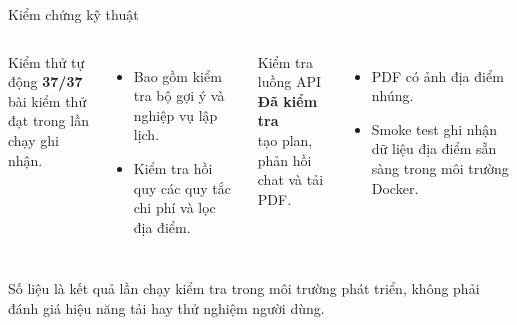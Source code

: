 \documentclass[aspectratio=169,11pt]{beamer}
\begin{document}
\begin{frame}{Kiểm chứng kỹ thuật}
  \begin{columns}[T,onlytextwidth]
      \begin{block}{Kiểm thử tự động}
        \centering
        {\Huge\color{travelgreen}\bfseries 37/37}\\
        \small bài kiểm thử đạt trong lần chạy ghi nhận.
      \end{block}
      \begin{itemize}
        \item Bao gồm kiểm tra bộ gợi ý và nghiệp vụ lập lịch.
        \item Kiểm tra hồi quy các quy tắc chi phí và lọc địa điểm.
      \end{itemize}
      \begin{block}{Kiểm tra luồng API}
        \centering
        {\Large\color{travelgreen}\bfseries Đã kiểm tra}\\
        \small tạo plan, phản hồi chat và tải PDF.
      \end{block}
      \begin{itemize}
        \item PDF có ảnh địa điểm nhúng.
        \item Smoke test ghi nhận dữ liệu địa điểm sẵn sàng trong môi trường Docker.
      \end{itemize}
  \end{columns}
  \vspace{0.15cm}
  {\scriptsize\color{muted}Số liệu là kết quả lần chạy kiểm tra trong môi trường phát triển, không phải đánh giá hiệu năng tải hay thử nghiệm người dùng.}
\end{frame}
\end{document}
